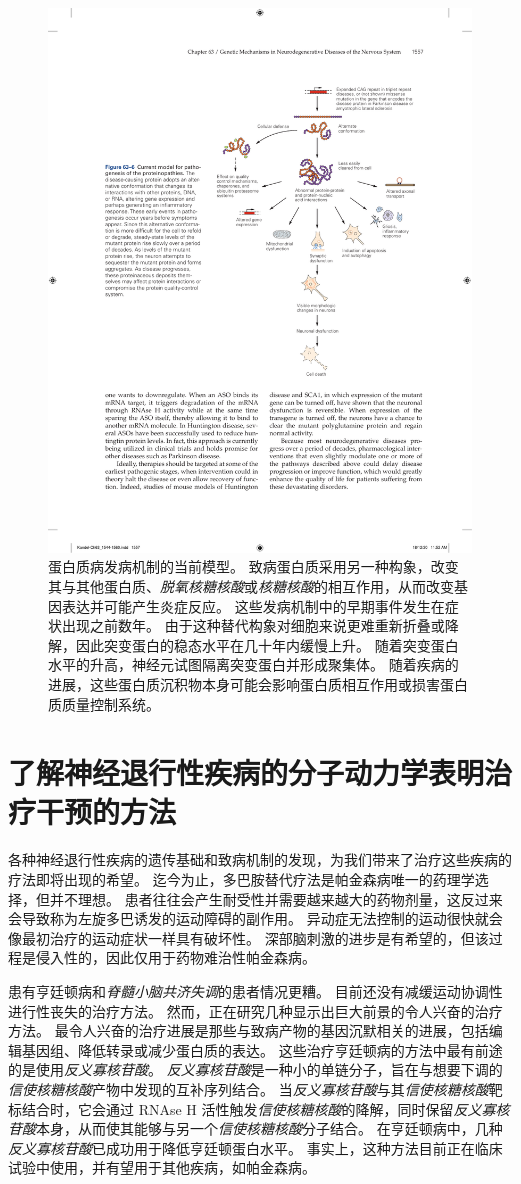 \begin{figure}[htbp]
	\centering
	\includegraphics[width=0.7\linewidth]{chap63/fig_63_6}
	\caption{蛋白质病发病机制的当前模型。
		致病蛋白质采用另一种构象，改变其与其他蛋白质、\textit{脱氧核糖核酸}或\textit{核糖核酸}的相互作用，从而改变基因表达并可能产生炎症反应。
		这些发病机制中的早期事件发生在症状出现之前数年。
		由于这种替代构象对细胞来说更难重新折叠或降解，因此突变蛋白的稳态水平在几十年内缓慢上升。
		随着突变蛋白水平的升高，神经元试图隔离突变蛋白并形成聚集体。
		随着疾病的进展，这些蛋白质沉积物本身可能会影响蛋白质相互作用或损害蛋白质质量控制系统。}
	\label{fig:63_6}
\end{figure}



\section{了解神经退行性疾病的分子动力学表明治疗干预的方法}

各种神经退行性疾病的遗传基础和致病机制的发现，为我们带来了治疗这些疾病的疗法即将出现的希望。
迄今为止，多巴胺替代疗法是帕金森病唯一的药理学选择，但并不理想。
患者往往会产生耐受性并需要越来越大的药物剂量，这反过来会导致称为左旋多巴诱发的运动障碍的副作用。
异动症无法控制的运动很快就会像最初治疗的运动症状一样具有破坏性。
深部脑刺激的进步是有希望的，但该过程是侵入性的，因此仅用于药物难治性帕金森病。


患有亨廷顿病和\textit{脊髓小脑共济失调}的患者情况更糟。
目前还没有减缓运动协调性进行性丧失的治疗方法。
然而，正在研究几种显示出巨大前景的令人兴奋的治疗方法。
最令人兴奋的治疗进展是那些与致病产物的基因沉默相关的进展，包括编辑基因组、降低转录或减少蛋白质的表达。
这些治疗亨廷顿病的方法中最有前途的是使用\textit{反义寡核苷酸}。
\textit{反义寡核苷酸}是一种小的单链分子，旨在与想要下调的\textit{信使核糖核酸}产物中发现的互补序列结合。
当\textit{反义寡核苷酸}与其\textit{信使核糖核酸}靶标结合时，它会通过 RNAse H 活性触发\textit{信使核糖核酸}的降解，同时保留\textit{反义寡核苷酸}本身，从而使其能够与另一个\textit{信使核糖核酸}分子结合。
在亨廷顿病中，几种\textit{反义寡核苷酸}已成功用于降低亨廷顿蛋白水平。
事实上，这种方法目前正在临床试验中使用，并有望用于其他疾病，如帕金森病。


